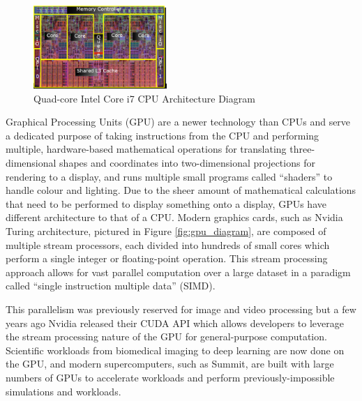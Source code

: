 \documentclass[conference]{IEEEtran}
\begin{document}
\begin{figure}
\centering
\includegraphics[width=0.45\textwidth]{images/cpu_diagram.png}
\caption{Quad-core Intel Core i7 CPU Architecture Diagram}
\label{fig:cpu_diagram}
\end{figure}

Graphical Processing Units (GPU) are a newer technology than CPUs and serve a dedicated purpose of taking instructions from the CPU and performing multiple, hardware-based mathematical operations for translating three-dimensional shapes and coordinates into two-dimensional projections for rendering to a display, and runs multiple small programs called ``shaders” to handle colour and lighting. Due to the sheer amount of mathematical calculations that need to be performed to display something onto a display, GPUs have different architecture to that of a CPU. Modern graphics cards, such as Nvidia Turing architecture, pictured in Figure \ref{fig:gpu_diagram}, are composed of multiple stream processors, each divided into hundreds of small cores which perform a single integer or floating-point operation. This stream processing approach allows for vast parallel computation over a large dataset in a paradigm called ``single instruction multiple data” (SIMD).


This parallelism was previously reserved for image and video processing but a few years ago Nvidia released their CUDA API\cite{cuda_talk}\cite{CUDA} which allows developers to leverage the stream processing nature of the GPU for general-purpose computation. Scientific workloads from biomedical imaging\cite{luebke2008cuda} to deep learning\cite{tang2013deep} are now done on the GPU, and modern supercomputers, such as Summit, are built with large numbers of GPUs to accelerate workloads and perform previously-impossible simulations and workloads.
\end{document}
